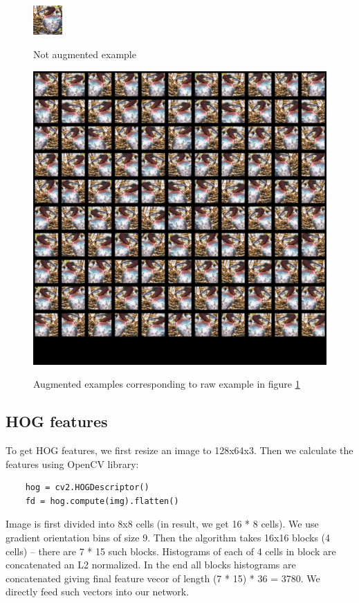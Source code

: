 \documentclass[a4paper]{article}
\begin{document}
\begin{figure}[h]
    \caption[]{Not augmented example}
    \centering
    \includegraphics[page=2,width=0.1\textwidth]{aug1.png}
    \label{fig:aug1}
\end{figure}

\begin{figure}[h]
    \caption[]{Augmented examples corresponding to raw example in figure \ref{fig:aug1}}
    \centering
    \includegraphics[page=2,width=1.0\textwidth]{aug2.png}
    \label{fig:aug2}
\end{figure}


\subsection{HOG features}
To get HOG features, we first resize an image to 128x64x3.
Then we calculate the features using OpenCV library:
\begin{verbatim}
    hog = cv2.HOGDescriptor()
    fd = hog.compute(img).flatten()
\end{verbatim}
Image is first divided into 8x8 cells (in result, we get 16 * 8 cells).
We use gradient orientation bins of size 9.
Then the algorithm takes 16x16 blocks (4 cells) --
there are 7 * 15 such blocks.
Histograms of each of 4 cells in block are concatenated an L2 normalized.
In the end all blocks histograms are concatenated giving
final feature vecor of length (7 * 15) * 36 = 3780.
We directly feed such vectors into our network.
\end{document}
